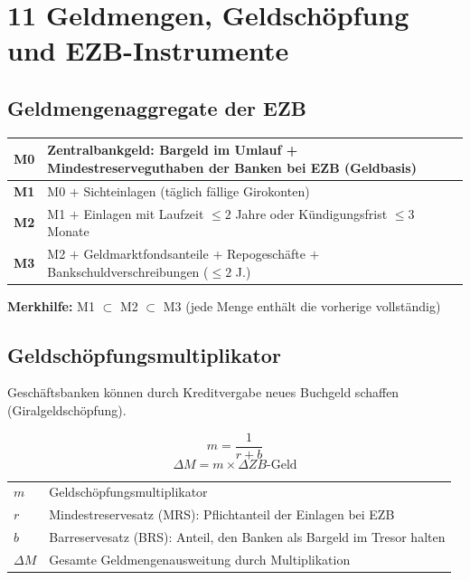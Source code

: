 \documentclass[10pt,a4paper]{article}
\begin{document}
\newpage

\section{11 \quad Geldmengen, Geldschöpfung und EZB-Instrumente}

\begin{multicols}{2}

\subsection{Geldmengenaggregate der EZB}

\begin{tabular}{|L{1cm}|L{6cm}|}
\hline
{}
\textbf{M0} & Zentralbankgeld: Bargeld im Umlauf + Mindestreserveguthaben der Banken bei EZB (Geldbasis) \\
\hline
\textbf{M1} & M0 $+$ Sichteinlagen (täglich fällige Girokonten) \\
\hline
\textbf{M2} & M1 $+$ Einlagen mit Laufzeit $\leq 2$ Jahre oder Kündigungsfrist $\leq 3$ Monate \\
\hline
\textbf{M3} & M2 $+$ Geldmarktfondsanteile $+$ Repogeschäfte $+$ Bankschuldverschreibungen ($\leq 2$ J.) \\
\hline
\end{tabular}

\textbf{Merkhilfe:} M1 $\subset$ M2 $\subset$ M3 (jede Menge enthält die vorherige vollständig)

\subsection{Geldschöpfungsmultiplikator}

Geschäftsbanken können durch Kreditvergabe neues Buchgeld schaffen (Giralgeldschöpfung).

\begin{vwlbox}
\[
m = \frac{1}{r + b}
\]
\[
\Delta M = m \times \Delta Z\!B\text{-}{\text{Geld}}
\]
\end{vwlbox}

\begin{tabular}{|L{1.5cm}|L{5.5cm}|}
\hline
{}
$m$ & Geldschöpfungsmultiplikator \\
$r$ & Mindestreservesatz (MRS): Pflichtanteil der Einlagen bei EZB \\
$b$ & Barreservesatz (BRS): Anteil, den Banken als Bargeld im Tresor halten \\
$\Delta M$ & Gesamte Geldmengenausweitung durch Multiplikation \\
\hline
\end{tabular}


\end{multicols}
\end{document}
